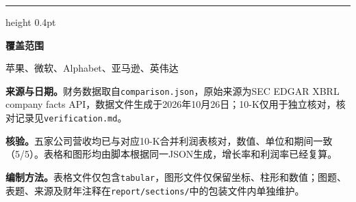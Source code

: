 \documentclass[a4paper,10pt]{article}
\newcommand{\DataDate}{2026年10月26日}
\newcommand{\Coverage}{苹果、微软、Alphabet、亚马逊、英伟达}
\begin{document}
{\color{MemoRule}\hrule height 0.4pt}\medskip
\begin{minipage}[t]{0.34\textwidth}
\vspace{0pt}\small
\textbf{覆盖范围}\par\Coverage
\end{minipage}\hfill
\begin{minipage}[t]{0.62\textwidth}
\vspace{0pt}\footnotesize
\setlength{\parskip}{3pt}
\textbf{来源与日期。}财务数据取自\texttt{comparison.json}，原始来源为SEC EDGAR XBRL company facts API，数据文件生成于\DataDate；10-K仅用于独立核对，核对记录见\texttt{verification.md}。

\textbf{核验。}五家公司营收均已与对应10-K合并利润表核对，数值、单位和期间一致（5/5）。表格和图形均由脚本根据同一JSON生成，增长率和利润率已经复算。

\textbf{编制方法。}表格文件仅包含\texttt{tabular}，图形文件仅保留坐标、柱形和数值；图题、表题、来源及财年注释在\texttt{report/sections/}中的包装文件内单独维护。
\end{minipage}
\end{document}
